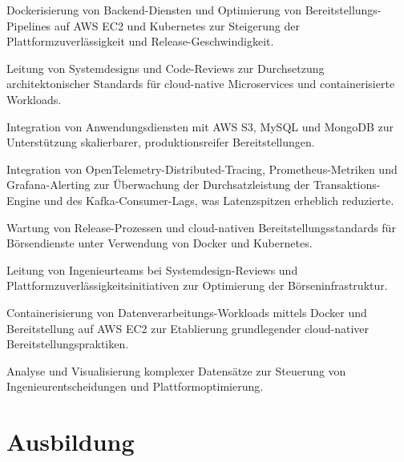 \documentclass[10pt,a4paper]{resume}
\begin{document}
\bullets
  \item Dockerisierung von Backend-Diensten und Optimierung von Bereitstellungs-Pipelines auf AWS EC2 und Kubernetes zur Steigerung der Plattformzuverlässigkeit und Release-Geschwindigkeit.
  \item Leitung von Systemdesigns und Code-Reviews zur Durchsetzung architektonischer Standards für cloud-native Microservices und containerisierte Workloads.
  \item Integration von Anwendungsdiensten mit AWS S3, MySQL und MongoDB zur Unterstützung skalierbarer, produktionsreifer Bereitstellungen.
\bulletsend
\vspace{1.5pt}
\bullets
  \item Integration von OpenTelemetry-Distributed-Tracing, Prometheus-Metriken und Grafana-Alerting zur Überwachung der Durchsatzleistung der Transaktions-Engine und des Kafka-Consumer-Lags, was Latenzspitzen erheblich reduzierte.
  \item Wartung von Release-Prozessen und cloud-nativen Bereitstellungsstandards für Börsendienste unter Verwendung von Docker und Kubernetes.
  \item Leitung von Ingenieurteams bei Systemdesign-Reviews und Plattformzuverlässigkeitsinitiativen zur Optimierung der Börseninfrastruktur.
\bulletsend
\vspace{1.5pt}
\bullets
  \item Containerisierung von Datenverarbeitungs-Workloads mittels Docker und Bereitstellung auf AWS EC2 zur Etablierung grundlegender cloud-nativer Bereitstellungspraktiken.
  \item Analyse und Visualisierung komplexer Datensätze zur Steuerung von Ingenieurentscheidungen und Plattformoptimierung.
\bulletsend
\vspace{1.5pt}

\section{Ausbildung}

\vspace{2pt}
\end{document}
